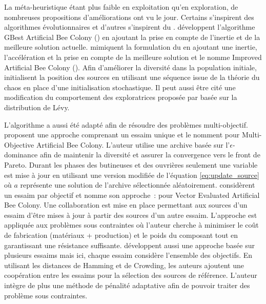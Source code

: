 La méta-heuristique étant plus faible en exploitation qu’en exploration, de nombreuses
propositions d’améliorations ont vu le jour. Certains s’inspirent des algorithmes
évolutionnaires \parencite{Bi2011174,Zhao2010558} et d’autres s’inspirent du .
\textcite{Zhu20103166} développent l’algorithme GBest Artificial Bee Colony () en
ajoutant la prise en compte de l’inertie et de la meilleure solution actuelle.
\textcite{Li2012320} mimiquent la formulation du  en ajoutant une inertie, l’accélération et la prise
en compte de la meilleure solution et le nomme Improved Artificial Bee Colony ().
Afin d’améliorer la diversité dans la population initiale, \textcite{Xiang20131256}
initialisent la position des sources en utilisant une séquence issue de la théorie
du chaos en place d’une initialisation stochastique. Il peut aussi être cité
une modification du comportement des exploratrices proposée par \textcite{Sharma2012213}
basée sur la distribution de Lévy.

L’algorithme a aussi été adapté afin de résoudre des problèmes multi-objectif.
\textcite{Akbari201239} proposent une approche comprenant un essaim unique et le nomment
 pour Multi-Objective Artificial Bee Colony. L’auteur utilise une archive
basée sur l’$\epsilon$-dominance afin de maintenir la diversité et assurer la convergence
vers le front de Pareto. Durant les phases des butineuses et des ouvrières seulement une
variable est mise à jour en utilisant une version modifiée de l’équation
\eqref{eq:update_source} où $a$ représente une solution de l’archive sélectionnée
aléatoirement.
\textcite{Omkar2011489} considèrent un essaim par objectif et nomme son approche~: 
pour Vector Evaluated Artificial Bee Colony. Une collaboration est mise en place
permettant aux sources d’un essaim d’être mises à jour à partir des sources d’un autre
essaim. L’approche est appliquée aux problèmes sous contraintes où l’auteur cherche à
minimiser le coût de fabrication (matériaux + production) et le poids du composant tout en
garantissant une résistance suffisante.
\textcite{Zhang20121} développent aussi une approche basée sur plusieurs essaims mais ici,
chaque essaim considère l’ensemble des objectifs. En utilisant les distances de Hamming et
de Crowding, les auteurs ajoutent une coopération entre les essaims pour la sélection des
sources de référence. L’auteur intègre de plus une méthode de pénalité adaptative
\parencite{Woldesenbet20073077} afin de pouvoir traiter des problème sous contraintes.

